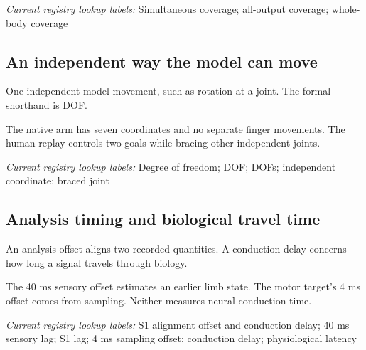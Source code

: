 \noindent\textit{Current registry lookup labels:} Simultaneous coverage; all-output coverage; whole-body coverage\par

\begin{samepage}
\subsection*{An independent way the model can move}
\noindent One independent model movement, such as rotation at a joint. The formal shorthand is DOF.\par
\end{samepage}
\begin{samepage}
\noindent The native arm has seven coordinates and no separate finger movements. The human replay controls two goals while bracing other independent joints.\par\nopagebreak[4]

\end{samepage}


\noindent\textit{Current registry lookup labels:} Degree of freedom; DOF; DOFs; independent coordinate; braced joint\par

\begin{samepage}
\subsection*{Analysis timing and biological travel time}
\noindent An analysis offset aligns two recorded quantities. A conduction delay concerns how long a signal travels through biology.\par
\end{samepage}
\begin{samepage}
\noindent The 40 ms sensory offset estimates an earlier limb state. The motor target’s 4 ms offset comes from sampling. Neither measures neural conduction time.\par\nopagebreak[4]

\end{samepage}


\noindent\textit{Current registry lookup labels:} S1 alignment offset and conduction delay; 40 ms sensory lag; S1 lag; 4 ms sampling offset; conduction delay; physiological latency\par

